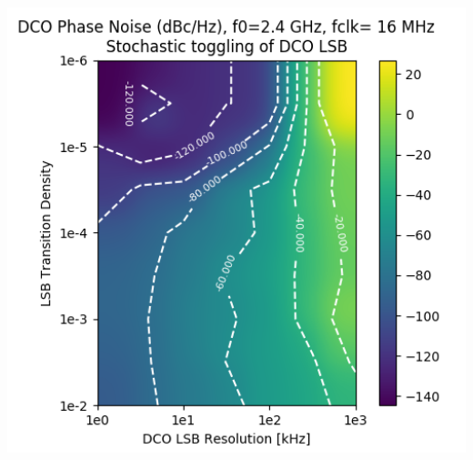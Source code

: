 \documentclass[10pt,a4paper]{article}
\begin{document}
		\begin{minipage}{5cm}
			\includegraphics[width=1\textwidth, angle=0]{figs/lsb_stochastic_pn.png}
		\end{minipage}%

		\flushleft
\end{document}
